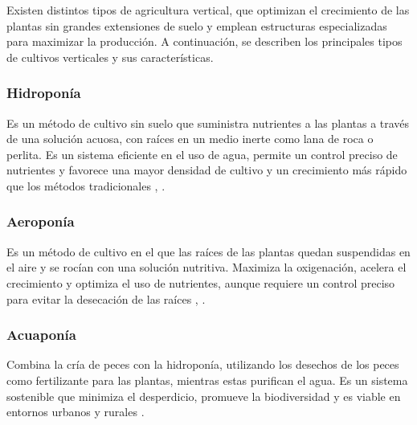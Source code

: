 

Existen distintos tipos de agricultura vertical, que optimizan el crecimiento de las plantas sin grandes extensiones de suelo y emplean estructuras especializadas para maximizar la producción.
A continuación, se describen los principales tipos de cultivos verticales y sus características.

\subsubsection{Hidroponía}
Es un método de cultivo sin suelo que suministra nutrientes a las plantas a través de una solución acuosa, con raíces en un medio inerte como lana de roca o perlita. Es un sistema eficiente en el uso de agua, permite un control preciso de nutrientes y favorece una mayor densidad de cultivo y un crecimiento más rápido que los métodos tradicionales \cite{SANTANDER}, \cite{CULTIVOS:TIPOS}.
\subsubsection{Aeroponía}
Es un método de cultivo en el que las raíces de las plantas quedan suspendidas en el aire y se rocían con una solución nutritiva. Maximiza la oxigenación, acelera el crecimiento y optimiza el uso de nutrientes, aunque requiere un control preciso para evitar la desecación de las raíces \cite{SANTANDER}, \cite{CULTIVOS:TIPOS}.
\subsubsection{Acuaponía}
Combina la cría de peces con la hidroponía, utilizando los desechos de los peces como fertilizante para las plantas, mientras estas purifican el agua. Es un sistema sostenible que minimiza el desperdicio, promueve la biodiversidad y es viable en entornos urbanos y rurales \cite{CULTIVOS:TIPOS}.


